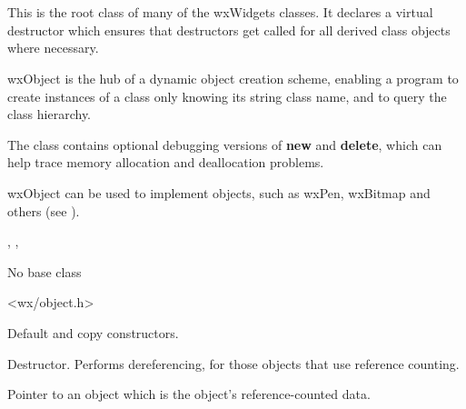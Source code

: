 \section{}\label{wxobject}

This is the root class of many of the wxWidgets classes.
It declares a virtual destructor which ensures that
destructors get called for all derived class objects where necessary.

wxObject is the hub of a dynamic object creation
scheme, enabling a program to create instances of a class only knowing
its string class name, and to query the class hierarchy.

The class contains optional debugging versions
of {\bf new} and {\bf delete}, which can help trace memory allocation
and deallocation problems.

wxObject can be used to implement  objects,
such as wxPen, wxBitmap and others (see ).


, ,\rtfsp
{}


No base class


<wx/object.h>




\label{wxobjectctor}



Default and copy constructors.

\label{wxobjectdtor}


Destructor. Performs dereferencing, for those objects
that use reference counting.

\label{wxobjectmrefdata}


Pointer to an object which is the object's reference-counted data.

